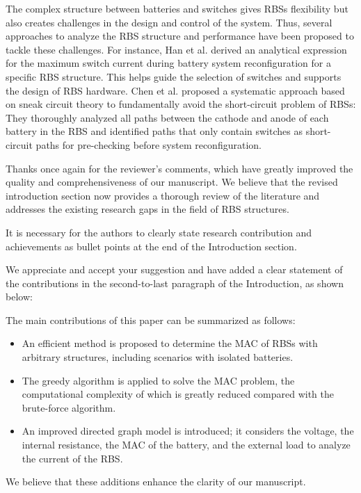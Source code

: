 \begin{revresponse}
\begin{changes}
The complex structure between batteries and switches gives RBSs flexibility but also creates challenges in the design and control of the system. 
Thus, several approaches to analyze the RBS structure and performance have been proposed to tackle these challenges.
For instance, 
Han et al. \cite{han2021analysis} derived an analytical expression for the maximum switch current during battery system reconfiguration for a specific RBS structure. 
This helps guide the selection of switches and supports the design of RBS hardware.
Chen et al. \cite{chenSneakCircuitTheory2021} proposed a systematic approach based on  sneak circuit theory to fundamentally avoid the short-circuit problem of RBSs: 
They thoroughly analyzed all paths between the cathode and anode of each battery in the RBS and identified paths that only contain switches as short-circuit paths for pre-checking before system reconfiguration.
\end{changes}

  
Thanks once again for the reviewer's comments, which have greatly improved the quality and comprehensiveness of our manuscript. We believe that the revised introduction section now provides a thorough review of the literature and addresses the existing research gaps in the field of RBS structures.
  
\end{revresponse}

\begin{revcomment}
  It is necessary for the authors to clearly state research contribution and achievements as bullet points at the end of the Introduction section.
\end{revcomment}
\begin{revresponse}

We appreciate and accept your suggestion and have added a clear statement of the contributions in the second-to-last paragraph of the Introduction, as shown below:
\begin{changes}
The main contributions of this paper can be summarized as follows:
\begin{itemize}
  \item An efficient method is proposed to determine the MAC of RBSs with arbitrary structures, including scenarios with isolated batteries.
  \item The greedy algorithm is applied to solve the MAC problem, the computational complexity of which is greatly reduced compared with the brute-force algorithm.
  \item An improved directed graph model is introduced; it considers the voltage, the internal resistance, the MAC of the battery, and the external load to analyze the current of the RBS.
\end{itemize}
\end{changes}


We believe that these additions enhance the clarity of our manuscript. 

\end{revresponse}

